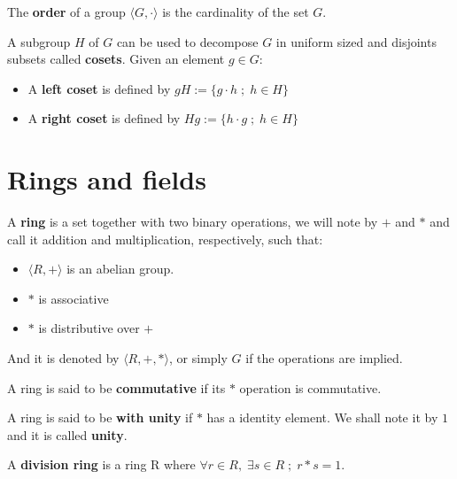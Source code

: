 \documentclass[Ingles]{ic-tese-v3}
\begin{document}
\begin{definition}
  The \textbf{order} of a group $\langle G,\cdot\rangle$ is the cardinality of the set $G$.
\end{definition}

\begin{definition}
  A subgroup $H$ of $G$ can be used to decompose $G$ in uniform sized and
  disjoints subsets called \textbf{cosets}. Given an element $g \in G$:
  \begin{itemize}
  \item A \textbf{left coset} is defined by $gH := \{g\cdot h \; ; \; h \in H\}$
  \item A \textbf{right coset} is defined by $Hg := \{h\cdot g \; ; \; h \in H\}$
  \end{itemize}
\end{definition}

\section{Rings and fields}
\label{sec:org8b9dbce}

   \begin{definition}
  A \textbf{ring} is a set together with two binary operations, we will note by
  $+$ and $*$ and call it addition and multiplication, respectively, such that:
  \begin{itemize}
  \item $\langle R,+\rangle$ is an abelian group.
  \item $*$ is associative
  \item $*$ is distributive over $+$
  \end{itemize}

  And it is denoted by $\langle R,+,*\rangle$, or simply $G$ if the operations are implied.
\end{definition}

\begin{definition}
  A ring is said to be \textbf{commutative} if its $*$ operation is commutative.
\end{definition}

\begin{definition}
  A ring is said to be \textbf{with unity} if $*$ has a identity element. We
  shall note it by $1$ and it is called \textbf{unity}.

\end{definition}

\begin{definition}
  A \textbf{division ring} is a ring R where $\forall r \in R, \; \exists s \in R \; ; \; r*s = 1$.
\end{definition}
\end{document}
